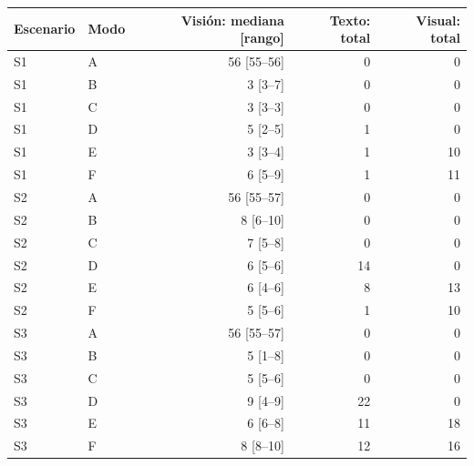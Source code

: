 \begin{tabular}{llrrr}
\hline
Escenario & Modo & Visión: mediana [rango] & Texto: total & Visual: total \\
\hline
S1 & A & 56 [55--56] & 0 & 0 \\
S1 & B & 3 [3--7] & 0 & 0 \\
S1 & C & 3 [3--3] & 0 & 0 \\
S1 & D & 5 [2--5] & 1 & 0 \\
S1 & E & 3 [3--4] & 1 & 10 \\
S1 & F & 6 [5--9] & 1 & 11 \\
S2 & A & 56 [55--57] & 0 & 0 \\
S2 & B & 8 [6--10] & 0 & 0 \\
S2 & C & 7 [5--8] & 0 & 0 \\
S2 & D & 6 [5--6] & 14 & 0 \\
S2 & E & 6 [4--6] & 8 & 13 \\
S2 & F & 5 [5--6] & 1 & 10 \\
S3 & A & 56 [55--57] & 0 & 0 \\
S3 & B & 5 [1--8] & 0 & 0 \\
S3 & C & 5 [5--6] & 0 & 0 \\
S3 & D & 9 [4--9] & 22 & 0 \\
S3 & E & 6 [6--8] & 11 & 18 \\
S3 & F & 8 [8--10] & 12 & 16 \\
\hline
\end{tabular}
